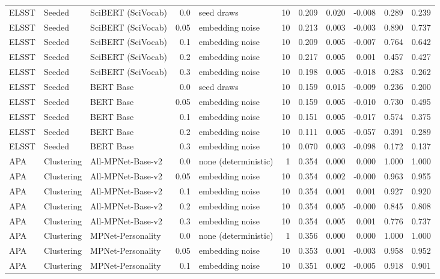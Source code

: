 \begin{table}[ht]
\begin{tabular}{lllrlrrrrrr}
ELSST & Seeded & SciBERT (SciVocab) & 0.0 & seed draws & 10 & 0.209 & 0.020 & -0.008 & 0.289 & 0.239 \\
ELSST & Seeded & SciBERT (SciVocab) & 0.05 & embedding noise & 10 & 0.213 & 0.003 & -0.003 & 0.890 & 0.737 \\
ELSST & Seeded & SciBERT (SciVocab) & 0.1 & embedding noise & 10 & 0.209 & 0.005 & -0.007 & 0.764 & 0.642 \\
ELSST & Seeded & SciBERT (SciVocab) & 0.2 & embedding noise & 10 & 0.217 & 0.005 & 0.001 & 0.457 & 0.427 \\
ELSST & Seeded & SciBERT (SciVocab) & 0.3 & embedding noise & 10 & 0.198 & 0.005 & -0.018 & 0.283 & 0.262 \\
ELSST & Seeded & BERT Base & 0.0 & seed draws & 10 & 0.159 & 0.015 & -0.009 & 0.236 & 0.200 \\
ELSST & Seeded & BERT Base & 0.05 & embedding noise & 10 & 0.159 & 0.005 & -0.010 & 0.730 & 0.495 \\
ELSST & Seeded & BERT Base & 0.1 & embedding noise & 10 & 0.151 & 0.005 & -0.017 & 0.574 & 0.375 \\
ELSST & Seeded & BERT Base & 0.2 & embedding noise & 10 & 0.111 & 0.005 & -0.057 & 0.391 & 0.289 \\
ELSST & Seeded & BERT Base & 0.3 & embedding noise & 10 & 0.070 & 0.003 & -0.098 & 0.172 & 0.137 \\
APA & Clustering & All-MPNet-Base-v2 & 0.0 & none (deterministic) & 1 & 0.354 & 0.000 & 0.000 & 1.000 & 1.000 \\
APA & Clustering & All-MPNet-Base-v2 & 0.05 & embedding noise & 10 & 0.354 & 0.002 & -0.000 & 0.963 & 0.955 \\
APA & Clustering & All-MPNet-Base-v2 & 0.1 & embedding noise & 10 & 0.354 & 0.001 & 0.001 & 0.927 & 0.920 \\
APA & Clustering & All-MPNet-Base-v2 & 0.2 & embedding noise & 10 & 0.354 & 0.005 & -0.000 & 0.845 & 0.808 \\
APA & Clustering & All-MPNet-Base-v2 & 0.3 & embedding noise & 10 & 0.354 & 0.005 & 0.001 & 0.776 & 0.737 \\
APA & Clustering & MPNet-Personality & 0.0 & none (deterministic) & 1 & 0.356 & 0.000 & 0.000 & 1.000 & 1.000 \\
APA & Clustering & MPNet-Personality & 0.05 & embedding noise & 10 & 0.353 & 0.001 & -0.003 & 0.958 & 0.952 \\
APA & Clustering & MPNet-Personality & 0.1 & embedding noise & 10 & 0.351 & 0.002 & -0.005 & 0.918 & 0.901 \\

\end{tabular}
\end{table}
